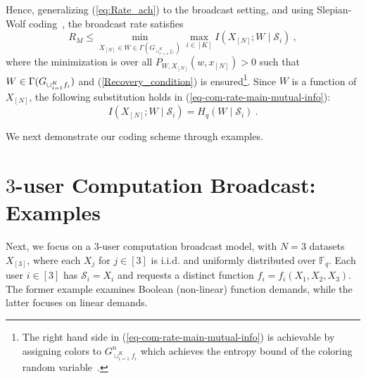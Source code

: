 \documentclass[conference, letterpaper]{IEEEtran} %
\begin{document}
Hence, generalizing (\ref{eq:Rate_ach}) to the broadcast setting, and using Slepian-Wolf coding~\cite{SlepWolf1973}, the broadcast rate %
satisfies
\begin{equation}
\label{eq-com-rate-main-mutual-info}
 R_M\leq\min_{X_{[N]}\in W\in \Gamma(G_{\cup_{i'=1}^{K}f_{i'}})}\max_{i\in [K]} I(X_{[N]} ;W\mid \mathcal{S}_{i}) \ ,  
\end{equation}
where the minimization is over all $P_{W, X_{[N]}}(w,x_{[N]})>0$ such that $W\in\Gamma(G_{\cup_{i=1}^{K}f_i})$ and (\ref{Recovery_condition}) is ensured\footnote{The right hand side in (\ref{eq-com-rate-main-mutual-info}) is achievable by assigning colors to %
$G^n_{\cup_{i=1}^{K} f_i}$ which achieves the entropy bound of the coloring random variable~\cite{korner1973coding,feizi2014network}.}. Since $W$ is a function of $X_{[N]}$, the following substitution holds in (\ref{eq-com-rate-main-mutual-info}):
\begin{equation}
\label{eq-rate-mutual-convert-entropy}
    I(X_{[N]} ;W\mid \mathcal{S}_{i})=H_q(W\mid \mathcal{S}_{i}) \ .  
\end{equation}


We next demonstrate our coding scheme through examples.




\section{\texorpdfstring{$3$}{}-user Computation Broadcast: Examples}
\label{sec:3-user-comp-broad}
Next, we focus on a $3$-user computation broadcast model, with $N=3$ datasets $X_{[3]}$, where each $X_{j}$ for $j\in[3]$ is i.i.d. and uniformly distributed over $\mathbb{F}_q$. Each user $i\in[3]$ has %
$\mathcal{S}_i=X_i$ and requests a distinct function $f_i=f_i(X_{1},X_{2},X_{3})$. The former example examines Boolean (non-linear) function demands, while the latter focuses on linear demands. 
\end{document}
